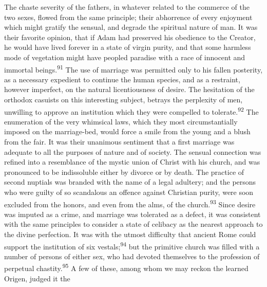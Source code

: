 


The chaste severity of the fathers, in whatever related to the
commerce of the two sexes, flowed from the same principle; their
abhorrence of every enjoyment which might gratify the sensual,
and degrade the spiritual nature of man. It was their favorite
opinion, that if Adam had preserved his obedience to the Creator,
he would have lived forever in a state of virgin purity, and that
some harmless mode of vegetation might have peopled paradise with
a race of innocent and immortal beings.\textsuperscript{91} The use of marriage
was permitted only to his fallen posterity, as a necessary
expedient to continue the human species, and as a restraint,
however imperfect, on the natural licentiousness of desire. The
hesitation of the orthodox casuists on this interesting subject,
betrays the perplexity of men, unwilling to approve an
institution which they were compelled to tolerate.\textsuperscript{92} The
enumeration of the very whimsical laws, which they most
circumstantially imposed on the marriage-bed, would force a smile
from the young and a blush from the fair. It was their unanimous
sentiment that a first marriage was adequate to all the purposes
of nature and of society. The sensual connection was refined into
a resemblance of the mystic union of Christ with his church, and
was pronounced to be indissoluble either by divorce or by death.
The practice of second nuptials was branded with the name of a
legal adultery; and the persons who were guilty of so scandalous
an offence against Christian purity, were soon excluded from the
honors, and even from the alms, of the church.\textsuperscript{93} Since desire
was imputed as a crime, and marriage was tolerated as a defect,
it was consistent with the same principles to consider a state of
celibacy as the nearest approach to the divine perfection. It was
with the utmost difficulty that ancient Rome could support the
institution of six vestals;\textsuperscript{94} but the primitive church was
filled with a number of persons of either sex, who had devoted
themselves to the profession of perpetual chastity.\textsuperscript{95} A few of
these, among whom we may reckon the learned Origen, judged it the
